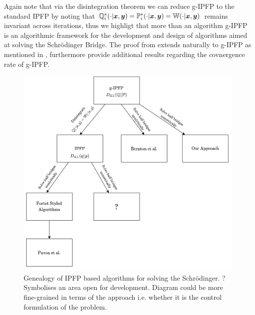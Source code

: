 \documentclass[a4paper,12pt,twoside,openright]{report}
\theoremstyle{definition}
\begin{document}
Again note that via the disintegration theorem we can reduce g-IPFP to the standard IPFP by noting that ${\mathbb{Q}}^*_i(\cdot |{\bm{x}},{\bm{y}}) ={\mathbb{P}}^*_i(\cdot |{\bm{x}},{\bm{y}}) = \mathbb{W}(\cdot |{\bm{x}},{\bm{y}})$ remains invariant across iterations, thus we highligt that more than an algorithm g-IPFP is an algorithmic framework for the development and design of algorithms aimed at solving the Schrödinger Bridge.
The proof from \cite{ruschendorf1995convergence} extends naturally to g-IPFP as mentioned in \cite{bernton2019schr}, furthermore \cite{bernton2019schr} provide additional results regarding the covnergence rate of g-IPFP.
\begin{figure}[h!]
    \centering
    \includegraphics[width=\linewidth]{images/IPFP_Geanology.png}
    \caption{Genealogy of IPFP based algorithms for solving the Schrödinger. ? Symbolises an area open for development. Diagram could be more fine-grained in terms of the approach i.e. whether it is the control formulation of the problem. }
    \label{fig:my_label}
\end{figure}

\end{document}
